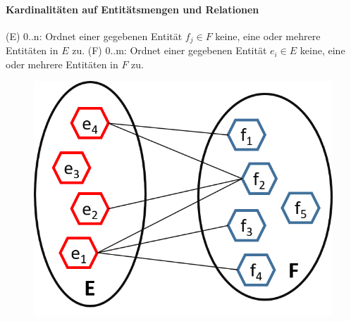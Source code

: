 \begin{frame}{\insertsection}
\framesubtitle{Kardinalitäten auf Entit\"atsmengen und Relationen}
\newline 
(E) 0..n: Ordnet einer gegebenen Entit\"at $f_j \in F$ keine, eine oder mehrere Entit\"aten in $E$ zu. 
\newline 
(F) 0..m: Ordnet einer gegebenen Entit\"at $e_i \in E$ keine, eine oder mehrere Entit\"aten in $F$ zu. 
\begin{figure}
	\includegraphics[scale=0.5]{img/ERM-n-m-Relation.png}
\end{figure}
\end{frame}


